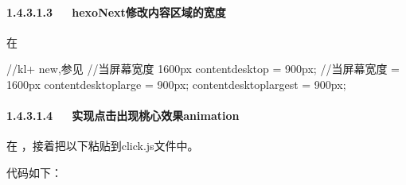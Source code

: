 \documentclass[letterpaper,12pt,english]{sphinxmanual}
\begin{document}
\paragraph{1.4.3.1.3   hexo\sphinxhyphen{}Next修改内容区域的宽度}
\label{\detokenize{001software/001install/001._u7f51_u7ad9/hexo:hexo-next}}


在 

\begin{sphinxVerbatim}[commandchars=\\\{\}]
//kl+ new,参见
//当屏幕宽度 \PYGZlt{} 1600px
\PYGZdl{}content\PYGZhy{}desktop                = 900px;
//当屏幕宽度 \PYGZgt{}= 1600px
\PYGZdl{}content\PYGZhy{}desktop\PYGZhy{}large          = 900px;
\PYGZdl{}content\PYGZhy{}desktop\PYGZhy{}largest        = 900px;
\end{sphinxVerbatim}


\paragraph{1.4.3.1.4   实现点击出现桃心效果animation}
\label{\detokenize{001software/001install/001._u7f51_u7ad9/hexo:animation}}
在  ，接着把以下粘贴到click.js文件中。

代码如下：
\end{document}
